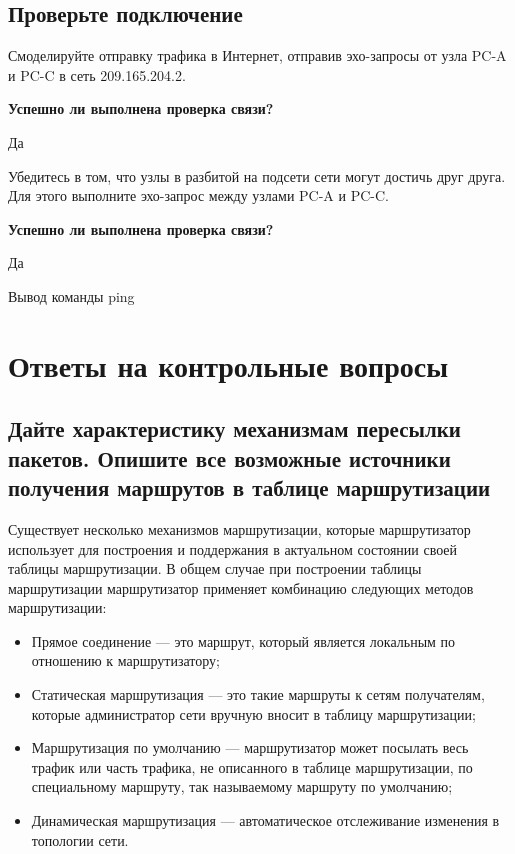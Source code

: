 \subsection{Проверьте подключение}

Смоделируйте отправку трафика в Интернет,
отправив эхо-запросы от узла PC-A и PC-C в сеть 209.165.204.2.

\textbf{Успешно ли выполнена проверка связи?}

Да

Убедитесь в том, что узлы в разбитой на подсети сети могут достичь друг друга.
Для этого выполните эхо-запрос между узлами PC-A и PC-C.

\textbf{Успешно ли выполнена проверка связи?}

Да

\begin{image}
	\caption{Вывод команды ping}
\end{image}

\section{Ответы на контрольные вопросы}

\subsection{Дайте характеристику механизмам пересылки пакетов.
	Опишите все возможные источники получения маршрутов
	в таблице маршрутизации}

Существует несколько механизмов маршрутизации,
которые маршрутизатор использует для построения
и поддержания в актуальном состоянии своей таблицы маршрутизации.
В общем случае при построении таблицы маршрутизации маршрутизатор
применяет комбинацию следующих методов маршрутизации:

\begin{itemize}
	\item Прямое соединение --- это маршрут, который является локальным
		по отношению к маршрутизатору;
	\item Статическая маршрутизация --- это такие маршруты к сетям получателям,
		которые администратор сети вручную вносит в таблицу маршрутизации;
	\item Маршрутизация по умолчанию --- маршрутизатор может посылать
		весь трафик или часть трафика, не описанного в таблице маршрутизации,
		по специальному маршруту, так называемому маршруту по умолчанию;
	\item Динамическая маршрутизация --- автоматическое отслеживание
		изменения в топологии сети.
\end{itemize}

